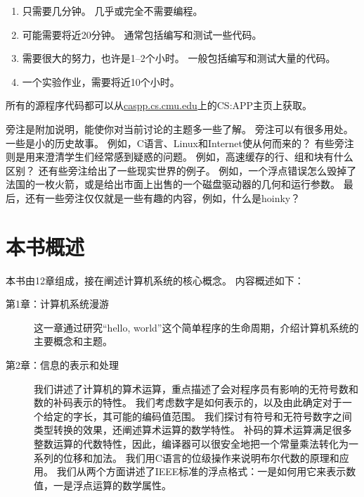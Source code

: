 {{        \begin{enumerate}
            \item
            {
                只需要几分钟。
                几乎或完全不需要编程。
            }
            \item
            {
                可能需要将近20分钟。
                通常包括编写和测试一些代码。
            }
            \item
            {
                需要很大的努力，也许是1--2个小时。
                一般包括编写和测试大量的代码。
            }
            \item 一个实验作业，需要将近10个小时。
        \end{enumerate}

        所有的源程序代码都可以从\url{caspp.cs.cmu.edu}上的CS:APP主页上获取。

        \begin{sidenote}[什么是旁注]
            旁注是附加说明，能使你对当前讨论的主题多一些了解。
            旁注可以有很多用处。
            一些是小的历史故事。
            例如，C语言、Linux和Internet使从何而来的？
            有些旁注则是用来澄清学生们经常感到疑惑的问题。
            例如，高速缓存的行、组和块有什么区别？
            还有些旁注给出了一些现实世界的例子。
            例如，一个浮点错误怎么毁掉了法国的一枚火箭，或是给出市面上出售的一个磁盘驱动器的几何和运行参数。
            最后，还有一些旁注仅仅就是一些有趣的内容，例如，什么是hoinky？
        \end{sidenote}
    }

    \section{本书概述}
    {
        本书由12章组成，接在阐述计算机系统的核心概念。
        内容概述如下：

        \begin{description}
            \item[第1章：计算机系统漫游] 这一章通过研究``hello, world''这个简单程序的生命周期，介绍计算机系统的主要概念和主题。
            \item[第2章：信息的表示和处理]
            {
                我们讲述了计算机的算术运算，重点描述了会对程序员有影响的无符号数和数的补码表示的特性。
                我们考虑数字是如何表示的，以及由此确定对于一个给定的字长，其可能的编码值范围。
                我们探讨有符号和无符号数字之间类型转换的效果，还阐述算术运算的数学特性。
                补码的算术运算满足很多整数运算的代数特性，因此，编译器可以很安全地把一个常量乘法转化为一系列的位移和加法。
                我们用C语言的位级操作来说明布尔代数的原理和应用。
                我们从两个方面讲述了IEEE标准的浮点格式：一是如何用它来表示数值，一是浮点运算的数学属性。

}
\end{description}}}
